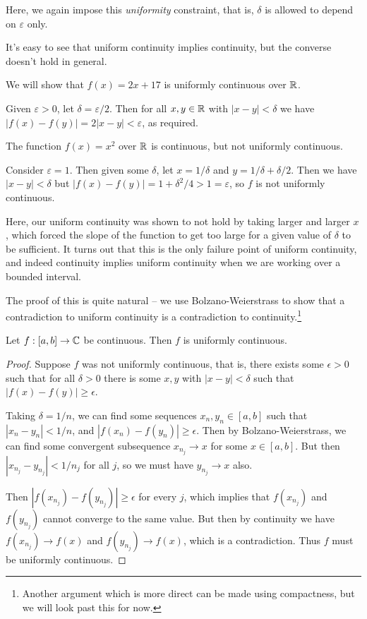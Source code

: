 \documentclass[a4paper]{scrartcl}
\begin{document}
Here, we again impose this \emph{uniformity} constraint, that is, $\delta$ is allowed to depend on $\varepsilon$ only. 

It's easy to see that uniform continuity implies continuity, but the converse doesn't hold in general.

\begin{example}
    We will show that $f(x) = 2x + 17$ is uniformly continuous over $\mathbb{R}$. 

    Given $\varepsilon > 0$, let $\delta = \varepsilon / 2$. Then for all $x, y \in \mathbb{R}$ with $|x - y| < \delta$ we have $|f(x) - f(y)| = 2|x - y| < \varepsilon$, as required.
\end{example}

\begin{example}
    The function $f(x) = x^2$ over $\mathbb{R}$ is continuous, but not uniformly continuous. 

    Consider $\varepsilon = 1$. Then given some $\delta$, let $x = 1/\delta$ and $y = 1/\delta + \delta/2$. Then we have $|x - y| < \delta$ but $|f(x) - f(y)| = 1 + \delta^2/4 > 1 = \varepsilon$, so $f$ is not uniformly continuous.
\end{example}

Here, our uniform continuity was shown to not hold by taking larger and larger $x$, which forced the slope of the function to get too large for a given value of $\delta$ to be sufficient. It turns out that this is the only failure point of uniform continuity, and indeed continuity implies uniform continuity when we are working over a bounded interval.

The proof of this is quite natural -- we use Bolzano-Weierstrass to show that a contradiction to uniform continuity is a contradiction to continuity.\footnote{Another argument which is more direct can be made using compactness, but we will look past this for now.}

\begin{theorem}
    Let $f: [a, b] \rightarrow \mathbb{C}$ be continuous. Then $f$ is uniformly continuous.
\end{theorem}
\begin{proof}
	Suppose $f$ was not uniformly continuous, that is, there exists some $\epsilon > 0$ such that for all $\delta > 0$ there is some $x, y$ with $|x - y| < \delta$ such that $|f(x) - f(y)| \geq \epsilon$.

	Taking $\delta = 1/n$, we can find some sequences $x_n, y_n \in [a, b]$ such that $|x_n - y_n| < 1/n$, and $|f(x_n) - f(y_n)| \geq \epsilon$. Then by Bolzano-Weierstrass, we can find some convergent subsequence $x_{n_j} \rightarrow x$ for some $x \in [a, b]$. But then $|x_{n_j} - y_{n_j}| < 1/n_j$ for all $j$, so we must have $y_{n_j} \rightarrow x$ also.

	Then $|f(x_{n_j}) - f(y_{n_j})| \geq \epsilon$ for every $j$, which implies that $f(x_{n_j})$ and $f(y_{n_j})$ cannot converge to the same value. But then by continuity we have $f(x_{n_j}) \rightarrow f(x)$ and $f(y_{n_j}) \rightarrow f(x)$, which is a contradiction. Thus $f$ must be uniformly continuous.
\end{proof}
\end{document}
